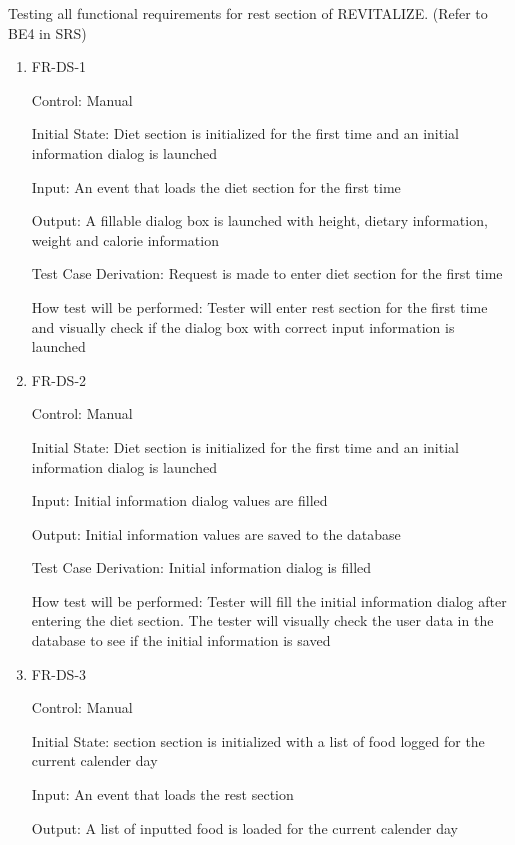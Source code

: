 \documentclass[12pt, titlepage]{article}
\begin{document}
Testing all functional requirements for rest section of REVITALIZE. (Refer to BE4 in SRS)

\begin{enumerate}

\item{FR-DS-1\\}

Control: Manual
					
Initial State: Diet section is initialized for the first time and an initial information dialog is launched
					
Input: An event that loads the diet section for the first time
					
Output: A fillable dialog box is launched with height, dietary information, weight and calorie information

Test Case Derivation: Request is made to enter diet section for the first time

How test will be performed: Tester will enter rest section for the first time and visually check if the dialog box with correct input information is launched
					
\item{FR-DS-2\\}

Control: Manual
					
Initial State: Diet section is initialized for the first time and an initial information dialog is launched
					
Input: Initial information dialog values are filled
					
Output: Initial information values are saved to the database

Test Case Derivation: Initial information dialog is filled

How test will be performed: Tester will fill the initial information dialog after entering the diet section. The tester will visually check the user data in the database to see if the initial information is saved
					

\item{FR-DS-3\\}

Control: Manual
					
Initial State: section section is initialized with a list of food logged for the current calender day
					
Input: An event that loads the rest section
					
Output: A list of inputted food is loaded for the current calender day


\end{enumerate}
\end{document}

